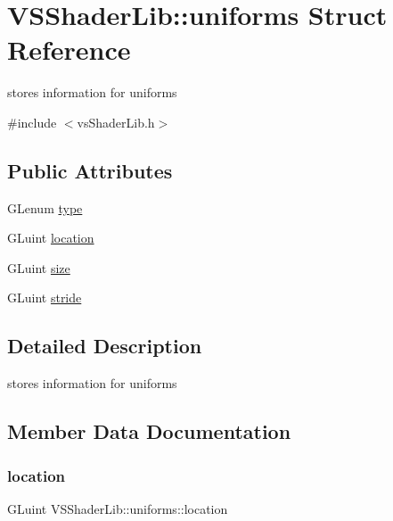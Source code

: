 \hypertarget{struct_v_s_shader_lib_1_1uniforms}{}\section{V\+S\+Shader\+Lib\+:\+:uniforms Struct Reference}
\label{struct_v_s_shader_lib_1_1uniforms}


stores information for uniforms  




{\ttfamily \#include $<$vs\+Shader\+Lib.\+h$>$}

\subsection*{Public Attributes}
\begin{DoxyCompactItemize}
\item 
G\+Lenum \hyperlink{struct_v_s_shader_lib_1_1uniforms_a24f7a9f89bd519b943015bc30ca7501b}{type}
\item 
G\+Luint \hyperlink{struct_v_s_shader_lib_1_1uniforms_a223d7fcee1d156215f76d9f2181e0033}{location}
\item 
G\+Luint \hyperlink{struct_v_s_shader_lib_1_1uniforms_afcc7514fb51e3109902164a9f5dd9d59}{size}
\item 
G\+Luint \hyperlink{struct_v_s_shader_lib_1_1uniforms_afa69bd45798a24073958bf99a9cacdc8}{stride}
\end{DoxyCompactItemize}


\subsection{Detailed Description}
stores information for uniforms 

\subsection{Member Data Documentation}
\mbox{\label{struct_v_s_shader_lib_1_1uniforms_a223d7fcee1d156215f76d9f2181e0033}} 
\subsubsection{\texorpdfstring{location}{location}}
{\footnotesize\ttfamily G\+Luint V\+S\+Shader\+Lib\+::uniforms\+::location}

